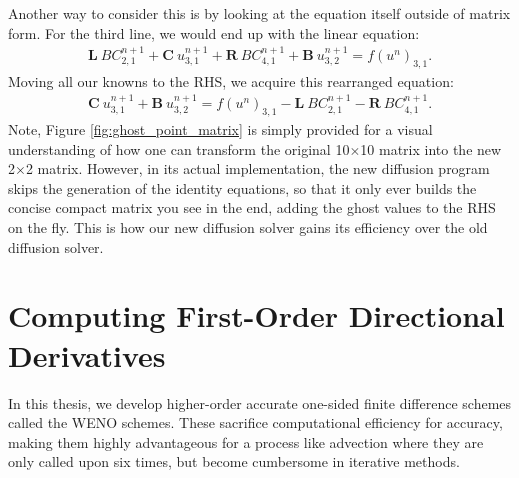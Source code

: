 \documentclass[oneside,12pt,final]{/Applications/TeX/packages/ucthesis-CA2012}
\begin{document}
\begin{mainmatter}
Another way to consider this is by looking at the equation itself outside of matrix form. For the third line, we would end up with the linear equation:
\begin{equation}
\begin{aligned}
\textbf{L} \> BC^{n+1}_{2,1} + \textbf{C} \> u^{n+1}_{3,1} + \textbf{R} \> BC^{n+1}_{4,1} + \textbf{B} \> u^{n+1}_{3,2} = f(u^{n})_{3,1}.
\end{aligned}
\end{equation}
Moving all our knowns to the RHS, we acquire this rearranged equation:
\begin{equation}
\begin{aligned}
\textbf{C} \> u^{n+1}_{3,1} + \textbf{B} \> u^{n+1}_{3,2} = f(u^{n})_{3,1} - \textbf{L} \> BC^{n+1}_{2,1} - \textbf{R} \> BC^{n+1}_{4,1}.
\end{aligned}
\end{equation}
Note, Figure \ref{fig:ghost_point_matrix} is simply provided for a visual understanding of how one can transform the original 10$\times$10 matrix into the new 2$\times$2 matrix. However, in its actual implementation, the new diffusion program skips the generation of the identity equations, so that it only ever builds the concise compact matrix you see in the end, adding the ghost values to the RHS on the fly. This is how our new diffusion solver gains its efficiency over the old diffusion solver.

\section{Computing First-Order Directional Derivatives}\label{section:efficiency_2}

In this thesis, we develop higher-order accurate one-sided finite difference schemes called the WENO schemes. These sacrifice computational efficiency for accuracy, making them highly advantageous for a process like advection where they are only called upon six times, but become cumbersome in iterative methods.
 

\end{mainmatter}
\end{document}
